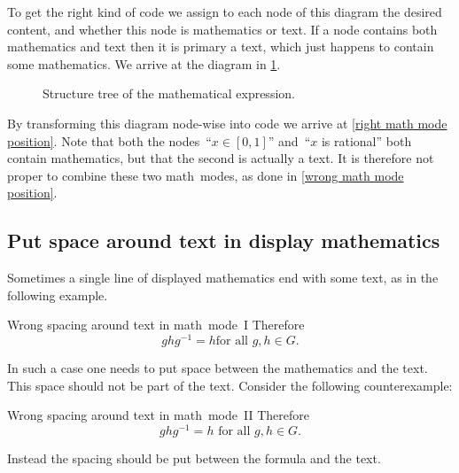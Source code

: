To get the right kind of code we assign to each node of this diagram the desired content, and whether this node is mathematics or text.
If a node contains both mathematics and text then it is primary a text, which just happens to contain some mathematics.
We arrive at the diagram in \cref{structure tree of math}.
\begin{figure}[tb]
  \begin{center}
  \end{center}
  \caption{Structure tree of the mathematical expression.}
  \label{structure tree of math}
\end{figure}
By transforming this diagram node-wise into code we arrive at \cref{right math mode position}.
Note that both the nodes~\enquote{$x \in [0,1]$} and~\enquote{$x$ is rational} both contain mathematics, but that the second is actually a text.
It is therefore not proper to combine these two math~modes, as done in \cref{wrong math mode position}.



\subsection{Put space around text in display mathematics}

Sometimes a single line of displayed mathematics end with some text, as in the following example.
\begin{showlatex}{Wrong spacing around text in math~mode~I}
Therefore
\[
  g h g^{-1}
  =
  h
  \text{for all $g, h \in G$}.
\]
\end{showlatex}
In such a case one needs to put space between the mathematics and the text.
This space should not be part of the text.
Consider the following counterexample:
\begin{showlatex}{Wrong spacing around text in math~mode~II}
Therefore
\[
  g h g^{-1}
  =
  h
  \text{ for all $g, h \in G$.}
\]
\end{showlatex}
Instead the spacing should be put between the formula and the text.

